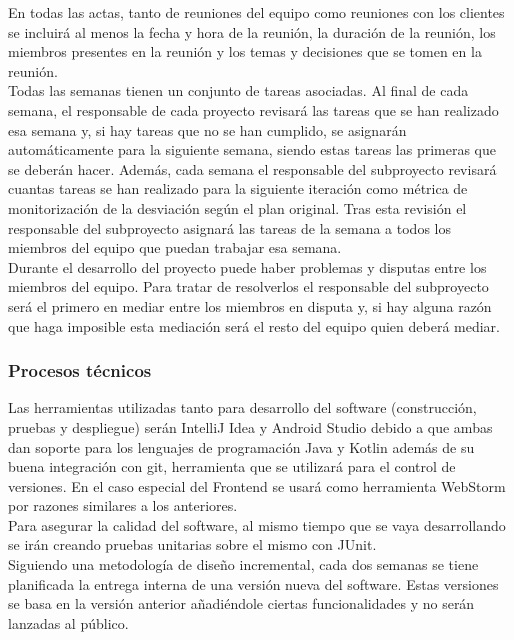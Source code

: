 \documentclass[12pt]{article}%
\begin{document}
En todas las actas, tanto de reuniones del equipo como reuniones con los clientes se incluir\'a al menos la fecha y hora de la reuni\'on, la duraci\'on de la reuni\'on, los miembros presentes en la reuni\'on y los temas y decisiones que se tomen en la reuni\'on.\\

Todas las semanas tienen un conjunto de tareas asociadas. Al final de cada semana, el responsable de cada proyecto revisar\'a las tareas que se han realizado esa semana y, si hay tareas que no se han cumplido, se asignar\'an autom\'aticamente para la siguiente semana, siendo estas tareas las primeras que se deber\'an hacer. Adem\'as, cada semana el responsable del subproyecto revisar\'a cuantas tareas se han realizado para la siguiente iteraci\'on  como m\'etrica de monitorizaci\'on de la desviaci\'on seg\'un el plan original. Tras esta revisi\'on el responsable del subproyecto asignar\'a las tareas de la semana a todos los miembros del equipo que puedan trabajar esa semana. \\

Durante el desarrollo del proyecto puede haber problemas y disputas entre los miembros del equipo. Para tratar de resolverlos el responsable del subproyecto ser\'a el primero en mediar entre los miembros en disputa y, si hay alguna raz\'on que haga imposible esta mediaci\'on ser\'a el resto del equipo quien deber\'a mediar. \\

\subsubsection{Procesos t\'ecnicos}
Las herramientas utilizadas tanto para desarrollo del software (construcci\'on, pruebas y despliegue) ser\'an IntelliJ Idea y Android Studio debido a que ambas dan soporte para los lenguajes de programaci\'on Java y Kotlin adem\'as de su buena integraci\'on con git, herramienta que se utilizar\'a para el control de versiones. En el caso especial del Frontend se usar\'a como herramienta WebStorm por razones similares a los anteriores.\\

Para asegurar la calidad del software, al mismo tiempo que se vaya desarrollando se ir\'an creando pruebas unitarias sobre el mismo con JUnit.\\

Siguiendo una metodolog\'ia de dise\~no incremental, cada dos semanas se tiene planificada la entrega interna de una versi\'on nueva del software.  Estas versiones se basa en la versi\'on anterior a\~nadi\'endole ciertas funcionalidades y no ser\'an lanzadas al p\'ublico.\\
\end{document}
